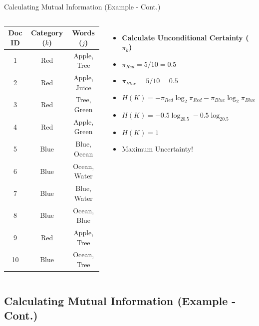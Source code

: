 \documentclass[
  ignorenonframetext,
  aspectratio=169]{beamer}
\begin{document}
\begin{frame}{Calculating Mutual Information (Example - Cont.)}
\begin{columns}
\footnotesize
{}
\begin{table}[h!]
\centering
\begin{tabular}{ccc}
\toprule
\textbf{Doc ID} & \textbf{Category ($k$)} & \textbf{Words ($j$)} \\ 
\midrule
 1 & Red & Apple, Tree   \\ 
 2 & Red & Apple, Juice  \\ 
 3 & Red & Tree, Green  \\ 
 4 & Red & Apple, Green  \\ 
 5 & Blue & Blue, Ocean  \\ 
 6 & Blue & Ocean, Water  \\ 
 7 & Blue & Blue, Water  \\ 
 8 & Blue & Ocean, Blue  \\ 
 9 & Red & Apple, Tree  \\ 
 10 & Blue & Ocean, Tree  \\ 
\bottomrule
\end{tabular}
\end{table}
\normalsize
{}
  \begin{itemize}
  \centering
  \item[] \hspace{2.5mm} \textbf{Calculate Unconditional Certainty ($\pi_{k}$)} \pause
  \item[] \hspace{2.5mm} $\pi_{Red} = 5/10 = 0.5 $
  \item[] \hspace{2.5mm} $\pi_{Blue} = 5/10 = 0.5$ \pause
  \item[] \hspace{2.5mm} $H(K) = -\pi_{Red}\log_2\pi_{Red}-\pi_{Blue}\log_2\pi_{Blue}$
  \item[] \hspace{2.5mm} $H(K) = -0.5\log_20.5-0.5\log_20.5$
  \item[] \hspace{2.5mm} $H(K) = 1$
  \item[] \hspace{2.5mm} Maximum Uncertainty! 
  \end{itemize}
  \vfill
\end{columns}
\end{frame}

\subsection{Calculating Mutual Information (Example -
Cont.)}\label{calculating-mutual-information-example---cont.-1}
\end{document}
